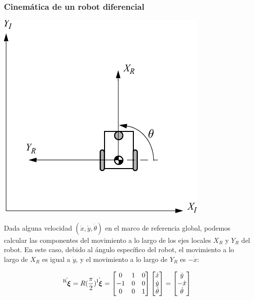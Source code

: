 \begin{frame}
    \frametitle{Cinemática de un robot diferencial}

    \begin{center}
        \includegraphics[width=0.2\columnwidth]{./images/coordinate_frame_rotation.pdf}
    \end{center}

    Dada alguna velocidad $(\dot{x}, \dot{y}, \dot{\theta})$ en el marco de referencia global, podemos calcular las componentes del movimiento a lo largo de los ejes locales $X_R$ y $Y_R$ del robot. En este caso, debido al ángulo específico del robot, el movimiento a lo largo de $X_R$ es igual a $\dot{y}$, y el movimiento a lo largo de $Y_R$ es $-\dot{x}$:

    \begin{equation*}
        \dot{\prescript{\mathrm{R}}{}{{\boldsymbol{\mathbf{\xi}}}_\mathrm{}}} = R(\frac{\pi}{2})\dot{\prescript{\mathrm{I}}{}{{\boldsymbol{\mathbf{\xi}}}_\mathrm{}}} =
        \begin{bmatrix}
            0 & 1 & 0 \\
            -1 & 0 & 0 \\
            0 & 0 & 1
        \end{bmatrix}
        \begin{bmatrix}
            \dot{x}\\
            \dot{y}\\
            \dot{\theta}
        \end{bmatrix}
         =
        \begin{bmatrix}
            \dot{y}\\
            -\dot{x}\\
            \dot{\theta}
        \end{bmatrix}
    \end{equation*}
\end{frame}


